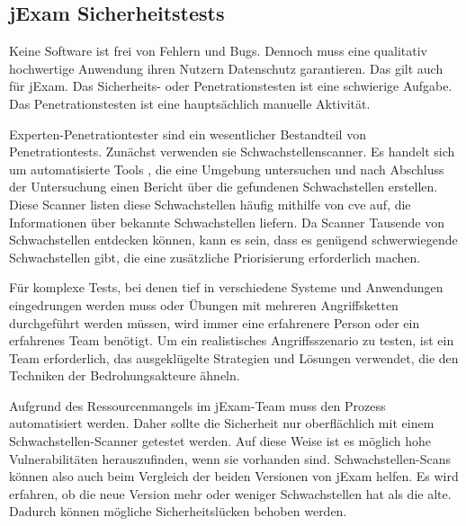 \subsection{jExam Sicherheitstests}\label{ch:sicherheit}

Keine Software ist frei von Fehlern und Bugs. Dennoch muss eine qualitativ
hochwertige Anwendung ihren Nutzern Datenschutz garantieren. Das gilt
auch f\"ur jExam. Das Sicherheits- oder Penetrationstesten  ist eine schwierige
Aufgabe. Das Penetrationstesten ist eine haupts\"achlich manuelle Aktivit\"at.

Experten-Penetrationtester sind ein wesentlicher Bestandteil
von Penetrationtests. Zunächst verwenden sie Schwachstellenscanner.
Es handelt sich um automatisierte Tools , die eine Umgebung untersuchen
und nach Abschluss der Untersuchung einen Bericht über die
gefundenen Schwachstellen erstellen. Diese Scanner listen diese
Schwachstellen häufig mithilfe von \gls{cve} auf, die Informationen
über bekannte Schwachstellen liefern. Da Scanner Tausende von
Schwachstellen entdecken können, kann es sein, dass es
genügend schwerwiegende Schwachstellen gibt, die eine zusätzliche
Priorisierung erforderlich machen.


Für komplexe Tests, bei denen tief in verschiedene Systeme und
Anwendungen eingedrungen werden muss oder \"Ubungen mit mehreren
Angriffsketten durchgeführt werden m\"ussen, wird immer eine
erfahrenere Person oder ein erfahrenes Team benötigt. Um ein
realistisches Angriffsszenario zu testen, ist ein Team erforderlich,
das ausgekl\"ugelte Strategien und Lösungen verwendet, die den
Techniken der Bedrohungsakteure ähneln.


Aufgrund des Ressourcenmangels im jExam-Team muss den Prozess
automatisiert werden.  Daher sollte die Sicherheit nur
oberflächlich mit einem Schwachstellen-Scanner getestet werden.
Auf diese Weise ist es m\"oglich hohe Vulnerabilit\"aten
herauszufinden, wenn sie vorhanden sind. Schwachstellen-Scans
k\"onnen also auch beim Vergleich der beiden Versionen von jExam
helfen. Es wird erfahren, ob die neue Version mehr oder weniger
Schwachstellen hat als die alte. Dadurch k\"onnen m\"ogliche
Sicherheitsl\"ucken behoben werden.